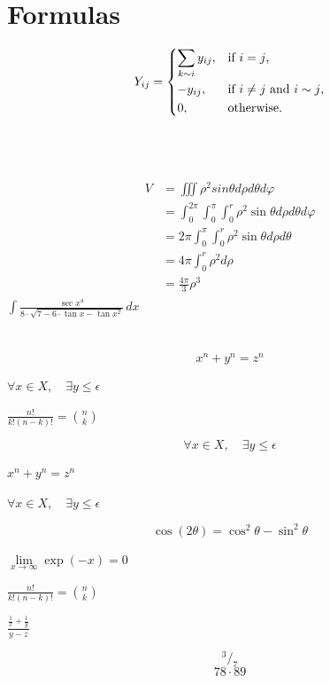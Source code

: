 \documentclass[10pt,a4paper]{report}
\begin{document}
\section{Formulas}
\begin{align}
    Y_{ij} = \begin{dcases*}
        \sum_{k \sim i}y_{ij}, & if $ i = j $,\\
        {-y_{ij}}, & if $ i \ne j $ and $ i \sim j $,\\
        0, & otherwise. 
        \end{dcases*}
\end{align}
\\
\\
\\
\begin{align}
    \begin{split}
      V &= \iiint \rho^{2} sin{\theta} d\rho d\theta d\varphi \\
      &= \int_{0}^{2\pi} \int_{0}^{\pi} \int_{0}^{r} \rho^{2} \sin{\theta} d\rho d\theta d\varphi \\
      &= 2\pi \int_{0}^{\pi} \int_{0}^{r} \rho^{2} \sin{\theta} d\rho d\theta \\
      &= 4\pi \int_{0}^{r} \rho^{2} d\rho \\
      &= \frac{4\pi}{3}\rho^{3}
    \end{split}
\end{align}
\begin{math}
\int{\frac{\sec{x}^4}{8 \cdot \sqrt{7 - 6 \cdot \tan{x} - \tan{x}^2}}\,dx}
\end{math}
\\
\\
\\


\[ x^n + y^n = z^n \]


$ \forall x \in X, \quad \exists y \leq \epsilon $

$ \frac{n!}{k!(n-k)!} = \binom{n}{k} $

$$ \forall x \in X, \quad \exists y \leq \epsilon $$


\begin{math}
x^n + y^n = z^n 
\end{math}

\begin{center}

$ \forall x \in X, \quad \exists y \leq \epsilon $

$$ \cos(2\theta) = \cos^2 \theta - \sin^2 \theta $$

$ \lim\limits_{x \to \infty} \exp(-x) = 0 $

$ \frac{n!}{k!(n-k)!} = \binom{n}{k} $

$ \frac{\frac{1}{x}+\frac{1}{y}}{y-z} $

$$ ^3/_7 $$
$$ 78 \cdot 89 $$
\end{center}
\end{document}

